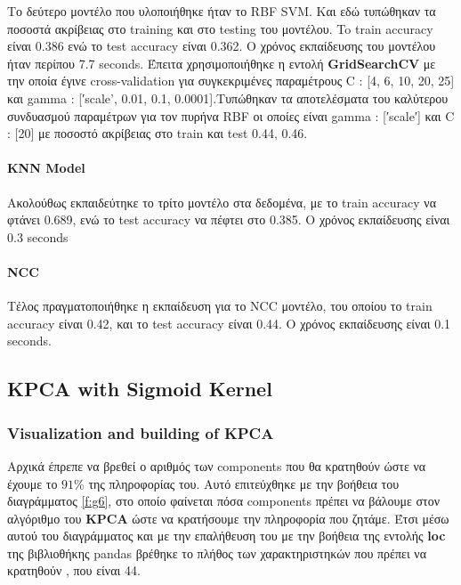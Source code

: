 Το δεύτερο μοντέλο που υλοποιήθηκε ήταν το RBF SVM. Και εδώ τυπώθηκαν τα ποσοστά
ακρίβειας στο training και στο testing του μοντέλου. To train accuracy είναι 0.386 ενώ το test accuracy είναι 0.362. Ο χρόνος εκπαίδευσης του μοντέλου ήταν περίπου 7.7 seconds.
Έπειτα χρησιμοποιήθηκε η εντολή \textbf{GridSearchCV} με την οποία έγινε cross-validation για συγκεκριμένες παραμέτρους C : [4, 6, 10, 20, 25] και gamma : [′scale', 0.01, 0.1, 0.0001].Τυπώθηκαν τα αποτελέσματα του καλύτερου
συνδυασμού παραμέτρων για τον πυρήνα RBF οι οποίες είναι gamma : [′scale′] και C :
[20] με ποσοστό ακρίβειας στο train και test 0.44, 0.46.

\paragraph{KNN Model}
Ακολούθως εκπαιδεύτηκε το τρίτο μοντέλο στα δεδομένα, με το train accuracy να φτάνει 0.689, ενώ το test accuracy να πέφτει στο 0.385. Ο χρόνος εκπαίδευσης είναι 0.3 seconds
\paragraph{NCC}
Τέλος πραγματοποιήθηκε η εκπαίδευση για το NCC μοντέλο, του οποίου το train accuracy είναι 0.42, και το test accuracy είναι 0.44. Ο χρόνος εκπαίδευσης είναι 0.1 seconds.
\clearpage


\subsection{KPCA with Sigmoid Kernel}
\subsubsection{Visualization and building of KPCA}
Αρχικά έπρεπε να βρεθεί ο αριθμός των components που θα κρατηθούν ώστε να έχουμε το $91\%$ της πληροφορίας του. Αυτό επιτεύχθηκε με την βοήθεια του διαγράμματος \ref{f:g6}, στο οποίο φαίνεται πόσα components πρέπει να βάλουμε στον αλγόριθμο του \textbf{KPCA} ώστε να κρατήσουμε την πληροφορία που ζητάμε. Έτσι μέσω αυτού του διαγράμματος και με την επαλήθευση του με την βοήθεια της εντολής \textbf{loc} της βιβλιοθήκης pandas βρέθηκε το πλήθος των χαρακτηριστηκών που πρέπει να κρατηθούν , που είναι 44.

